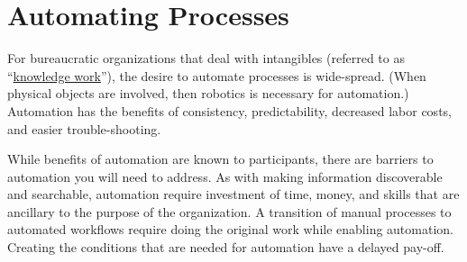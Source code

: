 \section{Automating Processes\label{sec:automating-processes}}




For bureaucratic organizations that deal with intangibles (referred to as ``\href{https://en.wikipedia.org/wiki/Knowledge_worker}{knowledge work}''), the desire to automate processes is wide-spread.  (When physical objects are involved, then robotics is necessary for automation.) Automation has the benefits of consistency, predictability, decreased labor costs, and easier trouble-shooting. 

While benefits of automation are known to participants, there are barriers to automation you will need to address.  
As with making information discoverable and searchable, automation require investment of time, money, and skills that are ancillary to the purpose of the organization. A transition of manual processes to automated workflows require doing the original work while enabling automation. Creating the conditions that are needed for automation have a delayed pay-off. 

